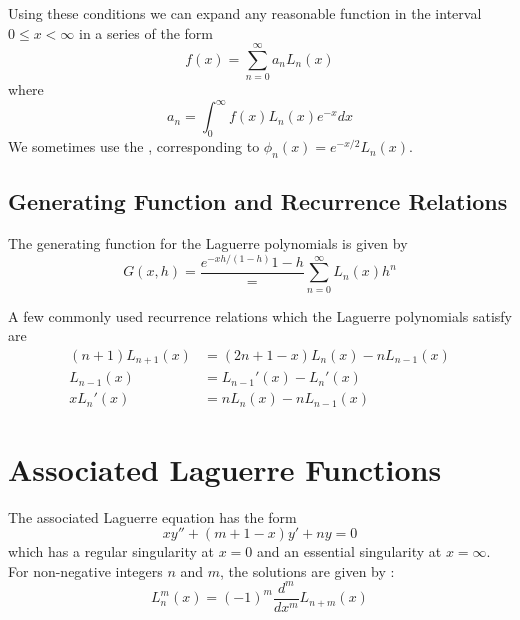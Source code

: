 \documentclass[12pt, a4paper, oneside, openright, titlepage]{book}
\begin{document}
Using these conditions we can expand any reasonable function in the interval $0 \leq x < \infty$ in a series of the form \begin{equation*}
    f(x) = \sum_{n=0}^{\infty}a_nL_n(x)
\end{equation*}
where \begin{equation*}
    a_n = \int_0^{\infty}f(x)L_n(x)e^{-x}dx
\end{equation*}
We sometimes use the , corresponding to $\phi_n(x) = e^{-x/2}L_n(x)$.

\subsection{Generating Function and Recurrence Relations}

\begin{defn}
    The generating function for the Laguerre polynomials is given by \begin{equation}
        G(x,h) = \frac{e^{-xh/(1-h)}{1-h}} = \sum_{n=0}^{\infty}L_n(x)h^n
    \end{equation}
\end{defn}

A few commonly used recurrence relations which the Laguerre polynomials satisfy are \begin{align*}
    (n+1)L_{n+1}(x) &= (2n+1-x)L_n(x) - nL_{n-1}(x) \\
    L_{n-1}(x) &= L_{n-1}'(x) - L_n'(x) \\
    xL_n'(x) &= nL_n(x) - nL_{n-1}(x)
\end{align*}


\section{Associated Laguerre Functions}

\begin{defn}
    The associated Laguerre equation has the form \begin{equation}
        xy'' + (m+1-x)y' + ny = 0
    \end{equation}
    which has a regular singularity at $x = 0$ and an essential singularity at $x = \infty$. For non-negative integers $n$ and $m$, the solutions are given by : \begin{equation}
        L_n^m(x) = (-1)^m\frac{d^m}{dx^m}L_{n+m}(x)
    \end{equation}
\end{defn}
\end{document}
